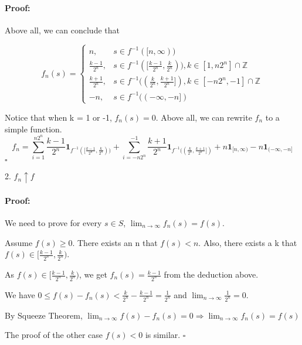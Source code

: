 \documentclass{article}
\newenvironment{myproof}{\ignorespaces\paragraph{Proof:}}{\hfill $\square$\par\noindent}
\begin{document}
\begin{myproof}
		
		Above all, we can conclude that
		
		$$
		f_n(s)=\left\{
		\begin{array}{lr}
		n,&s\in f^{-1}([n,\infty))\\
		\frac{k-1}{2^n},&s\in f^{-1}([\frac{k-1}{2^n}, \frac{k}{2^n})), k\in[1, n2^n]\cap\mathbb{Z}\\
		\frac{k+1}{2^n},&s\in f^{-1}((\frac{k}{2^n}, \frac{k+1}{2^n}]), k\in[-n2^n, -1]\cap\mathbb{Z}\\
		-n,&s\in f^{-1}((-\infty,-n])
		\end{array}\right.
		$$
		
		Notice that when k = 1 or -1, $f_n(s)=0$. Above all, we can rewrite $f_n$ to a simple function.
		$$
		f_n=\sum_{i=1}^{n2^n}\frac{k-1}{2^n}\boldsymbol{1}_{f^{-1}([\frac{k-1}{2^n}, \frac{k}{2^n}))}+\sum_{i=-n2^n}^{-1}\frac{k+1}{2^n}\boldsymbol{1}_{f^{-1}((\frac{k}{2^n}, \frac{k+1}{2^n}])}+n\boldsymbol{1}_{[n,\infty)}-n\boldsymbol{1}_{(-\infty,-n]}
		$$
	\end{myproof}

	2. $f_n\uparrow f$
	
	\begin{myproof}
		We need to prove for every $s\in S$, $\lim_{n\rightarrow\infty}f_n(s)=f(s)$.
		
		Assume $f(s)\geq0$. There exists an n that $f(s)<n$. Also, there exists a k that $f(s)\in[\frac{k-1}{2^n},\frac{k}{2^n})$.
		
		As $f(s)\in[\frac{k-1}{2^n},\frac{k}{2^n})$, we get $f_n(s)=\frac{k-1}{2^n}$ from the deduction above.
		
		We have $0\leq f(s)-f_n(s)<\frac{k}{2^n}-\frac{k-1}{2^n}=\frac{1}{2^n}$ and 		$\lim_{n\rightarrow\infty}\frac{1}{2^n}=0$.
		
		By Squeeze Theorem, $\lim_{n\rightarrow\infty}f(s)-f_n(s)=0\Rightarrow\lim_{n\rightarrow\infty}f_n(s)=f(s)$
		
		The proof of the other case $f(s)<0$ is similar.
	\end{myproof}
\end{document}
